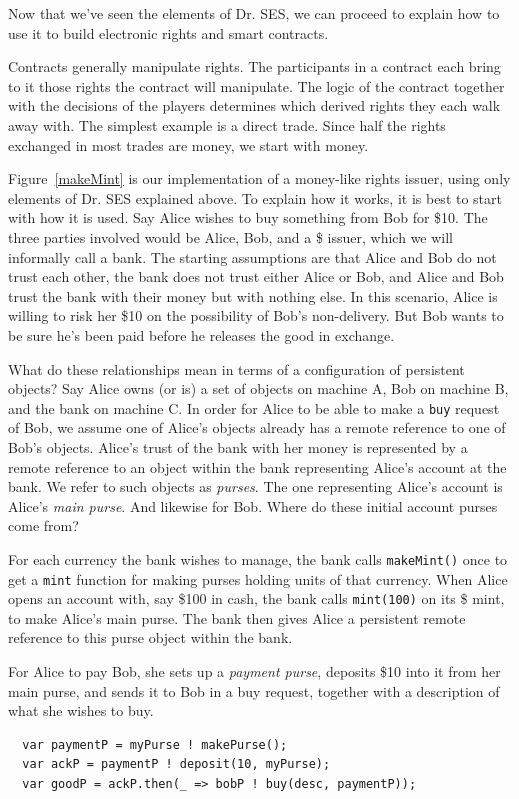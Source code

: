 \documentclass{llncs}
\begin{document}
Now that we've seen the elements of Dr. SES, we can proceed to explain how to use it to build electronic rights and smart contracts.

Contracts generally manipulate rights. The participants in a contract each bring to it those rights the contract will manipulate. The logic of the contract together with the decisions of the players determines which derived rights they each walk away with. The simplest example is a direct trade. Since half the rights exchanged in most trades are money, we start with money. 

Figure~\ref{makeMint}  is our implementation of a money-like rights issuer, using only elements of Dr. SES explained above. To explain how it works, it is best to start with how it is used. Say Alice wishes to buy something from Bob for \$10. The three parties involved would be Alice, Bob, and a \$ issuer, which we will informally call a bank. The starting assumptions are that Alice and Bob do not trust each other, the bank does not trust either Alice or Bob, and Alice and Bob trust the bank with their money but with nothing else. In this scenario, Alice is willing to risk her \$10 on the possibility of Bob's non-delivery. But Bob wants to be sure he's been paid before he releases the good in exchange.

What do these relationships mean in terms of a configuration of persistent objects? Say Alice owns (or is) a set of objects on machine A, Bob on machine B, and the bank on machine C. In order for Alice to be able to make a {\tt buy} request of Bob, we assume one of Alice's objects already has a remote reference to one of Bob's objects. Alice's trust of the bank with her money is represented by a remote reference to an object within the bank representing Alice's account at the bank. We refer to such objects as \emph{purses}. The one representing Alice's account is Alice's \emph{main purse}. And likewise for Bob. Where do these initial account purses come from?

For each currency the bank wishes to manage, the bank calls {\tt makeMint()} once to get a {\tt mint} function for making purses holding units of that currency. When Alice opens an account with, say \$100 in cash, the bank calls {\tt mint(100)} on its \$ mint, to make Alice's main purse. The bank then gives Alice a persistent remote reference to this purse object within the bank.

For Alice to pay Bob, she sets up a \emph{payment purse}, deposits \$10 into it from her main purse, and sends it to Bob in a buy request, together with a description of what she wishes to buy.
\begin{verbatim}
  var paymentP = myPurse ! makePurse();
  var ackP = paymentP ! deposit(10, myPurse);
  var goodP = ackP.then(_ => bobP ! buy(desc, paymentP));
\end{verbatim}
\end{document}
